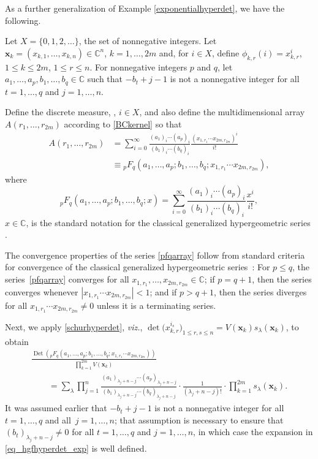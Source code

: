 \documentclass[10pt,a4paper]{amsart}
\numberwithin{equation}{section}
\def\C{{\mathbb C}}
\def\Det{\operatorname{Det}}
\def\xx{\boldsymbol{x}}
\begin{document}
As a further generalization of Example \ref{exponentialhyperdet}, we have the following.

\begin{Example}
\label{hgfhyperdet}
Let $X = \{0,1,2,\dots\}$, the set of nonnegative integers. Let $\xx_k = (x_{k,1},\dots,x_{k,n}) \in \C^n$, $k=1,\dots,2m$ and, for $i \in X$, define $\phi_{k,r}(i) = x_{k,r}^i$, $1 \le k \le 2m$, $1 \le r \le n$. For nonnegative integers $p$ and $q$, let $a_1,\dots,a_p,b_1,\dots,b_q \in \C$ such that $-b_t+j-1$ is not a nonnegative integer for all $t=1,\dots,q$ and $j=1,\dots,n$.

Define the discrete measure,
,
$i \in X$, and also define the multidimensional array $A(r_1,\dots,r_{2m})$ according to \eqref{BCkernel} so that
\begin{align}
A(r_1,\dots,r_{2m}) & = \sum_{i=0}^\infty \frac{(a_1)_i \cdots (a_p)_i}{(b_1)_i \cdots (b_q)_i} \frac{(x_{1,r_1} \cdots x_{2m,r_{2m}})^i}{i!} \nonumber\\
& \equiv {}_pF_q(a_1,\dots,a_p;b_1,\dots,b_q;x_{1,r_1} \cdots x_{2m,r_{2m}}),\label{pfqarray}
\end{align}
where
\begin{equation}
\label{classicalargpfq}
{}_pF_q(a_1,\dots,a_p;b_1,\dots,b_q;x) = \sum_{i=0}^\infty \frac{(a_1)_i \cdots (a_p)_i}{(b_1)_i \cdots (b_q)_i} \frac{x^i}{i!},
\end{equation}
$x \in \C$, is the standard notation for the classical generalized hypergeometric series \cite{andrews}.

The convergence properties of the series \eqref{pfqarray} follow from standard criteria for convergence of the classical generalized hypergeometric series~\cite[Theorem 2.1.1]{andrews}: For $p \le q$, the series~\eqref{pfqarray} converges for all $x_{1,r_1},\dots,x_{2m,r_{2m}} \in \C$; if $p = q+1$, then the series converges whenever $|x_{1,r_1} \cdots x_{2m,r_{2m}}| < 1$; and if $p > q+1$, then the series diverges for all $x_{1,r_1} \cdots x_{2m,r_{2m}} \neq 0$ unless it is a terminating series.

Next, we apply \eqref{schurhyperdet}, {\it viz.},
$
\det\bigl(x_{k,r}^{i_s}\bigr)_{1\le r,s\le n} = V(\xx_k) s_\lambda(\xx_k)$,
to obtain
\begin{gather}
\frac{\Det({}_pF_q(a_1,\dots,a_p;b_1,\dots,b_q;x_{1,r_1} \cdots x_{2m,r_{2m}}))}{\prod_{k=1}^{2m} V(\xx_k)}\nonumber \\
\qquad= \sum_\lambda \prod_{j=1}^n \frac{(a_1)_{\lambda_j+n-j} \cdots (a_p)_{\lambda_j+n-j}}{(b_1)_{\lambda_j+n-j} \cdots (b_q)_{\lambda_j+n-j}} \cdot \frac{1}{(\lambda_j+n-j)!} \cdot \prod_{k=1}^{2m} s_\lambda(\xx_k).\label{eq_hgfhyperdet_exp}
\end{gather}
It was assumed earlier that $-b_t+j-1$ is not a nonnegative integer for all $t=1,\dots,q$ and all~${j=1,\dots,n}$; that assumption is necessary to ensure that $(b_t)_{\lambda_j+n-j} \neq 0$ for all $t=1,\dots,q$ and $j=1,\dots,n$, in which case the expansion in \eqref{eq_hgfhyperdet_exp} is well defined.


\end{Example}
\end{document}
